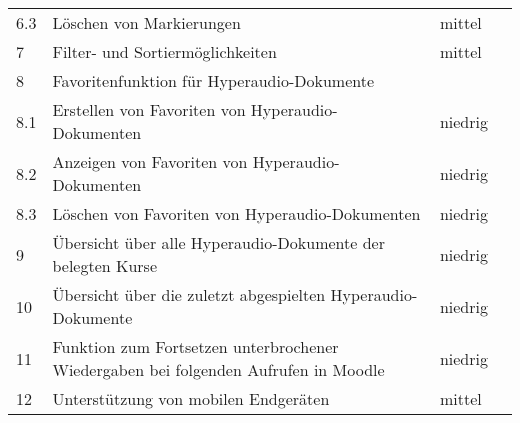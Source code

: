 \begin{table}[!ht]
\begin{tabularx}{\textwidth}{lXll}
   	6.3 & \hspace*{0.5cm} Löschen von Markierungen & mittel\\
   	7 & Filter- und Sortiermöglichkeiten & mittel\\
    8 & Favoritenfunktion für Hyperaudio-Dokumente & \\
    8.1 & \hspace*{0.5cm} Erstellen von Favoriten von Hyperaudio-Dokumenten & niedrig\\
    8.2 & \hspace*{0.5cm} Anzeigen von Favoriten von Hyperaudio-Dokumenten & niedrig\\
    8.3 & \hspace*{0.5cm} Löschen von Favoriten von Hyperaudio-Dokumenten & niedrig\\    
    9 & Übersicht über alle Hyperaudio-Dokumente der belegten Kurse & niedrig\\
    10 & Übersicht über die zuletzt abgespielten Hyperaudio-Dokumente & niedrig\\
    11 &  Funktion zum Fortsetzen unterbrochener Wiedergaben bei folgenden Aufrufen in Moodle & niedrig\\
    12 & Unterstützung von mobilen Endgeräten & mittel\\
    \hline
\end{tabularx}
\end{table}



